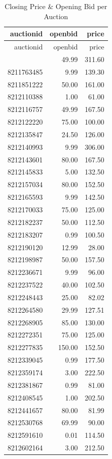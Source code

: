 \documentclass[
]{article}
\begin{document}
\begin{longtable}[]{@{}rrr@{}}
\caption{Closing Price \& Opening Bid per Auction}\tabularnewline
\toprule\noalign{}
auctionid & openbid & price \\
\midrule\noalign{}
\endfirsthead
\toprule\noalign{}
auctionid & openbid & price \\
\midrule\noalign{}
\endhead
\bottomrule\noalign{}
\endlastfoot
8211480551 & 49.99 & 311.60 \\
8211763485 & 9.99 & 139.30 \\
8211851222 & 50.00 & 161.00 \\
8212110388 & 1.00 & 61.00 \\
8212116757 & 49.99 & 167.50 \\
8212122220 & 75.00 & 100.00 \\
8212135847 & 24.50 & 126.00 \\
8212140993 & 9.99 & 306.00 \\
8212143601 & 80.00 & 167.50 \\
8212145833 & 5.00 & 132.50 \\
8212157034 & 80.00 & 152.50 \\
8212165593 & 9.99 & 142.50 \\
8212170033 & 75.00 & 125.00 \\
8212182237 & 50.00 & 112.50 \\
8212183207 & 0.99 & 100.50 \\
8212190120 & 12.99 & 28.00 \\
8212198987 & 50.00 & 157.50 \\
8212236671 & 9.99 & 96.00 \\
8212237522 & 40.00 & 102.50 \\
8212248443 & 25.00 & 82.02 \\
8212264580 & 29.99 & 127.51 \\
8212268905 & 85.00 & 130.00 \\
8212272351 & 75.00 & 125.00 \\
8212277835 & 150.00 & 152.50 \\
8212339045 & 0.99 & 177.50 \\
8212359174 & 3.00 & 222.50 \\
8212381867 & 0.99 & 81.00 \\
8212408545 & 1.00 & 202.50 \\
8212441657 & 80.00 & 81.99 \\
8212530768 & 69.99 & 90.00 \\
8212591610 & 0.01 & 114.50 \\
8212602164 & 3.00 & 212.50 \\

\end{longtable}
\end{document}
